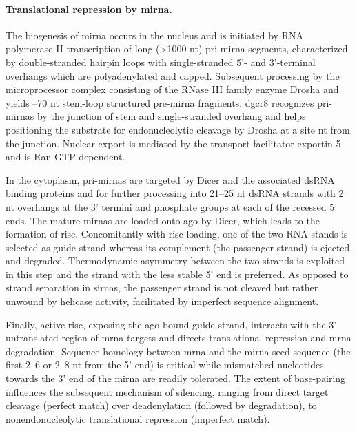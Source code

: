\paragraph{Translational repression by \gls{mirna}.}
The biogenesis of \gls{mirna} occurs in the nucleus and is initiated by RNA polymerase II transcription of long (\textgreater 1000 nt) \gls{pri-mirna} segments, characterized by double-stranded hairpin loops with single-stranded 5'- and 3'-terminal overhangs which are polyadenylated and capped. Subsequent processing by the microprocessor complex consisting of the RNase III family enzyme Drosha and  yields --70 nt stem-loop structured \gls{pre-mirna} fragments. \gls{dgcr8} recognizes \glspl{pri-mirna} by the junction of stem and single-stranded overhang and helps positioning the substrate for endonucleolytic cleavage by Drosha at a site  nt from the junction. Nuclear export is mediated by the transport facilitator exportin-5 and is Ran-GTP dependent.

In the cytoplasm, \glspl{pri-mirna} are targeted by Dicer and the associated dsRNA binding proteins  and  for further processing into 21--25 nt dsRNA strands with 2 nt overhangs at the 3' termini and phosphate groups at each of the recessed 5' ends. The mature \glspl{mirna} are loaded onto \gls{ago} by Dicer, which leads to the formation of \gls{risc}. Concomitantly with \gls{risc}-loading, one of the two RNA stands is selected as guide strand whereas its complement (the passenger strand) is ejected and degraded. Thermodynamic asymmetry between the two strands is exploited in this step and the strand with the less stable 5' end is preferred. As opposed to strand separation in \glspl{sirna}, the passenger strand is not cleaved but rather unwound by helicase activity, facilitated by imperfect sequence alignment.

Finally, active \gls{risc}, exposing the \glsdesc{ago}-bound guide strand, interacts with the 3' untranslated region of \gls{mrna} targets and directs translational repression and \gls{mrna} degradation. Sequence homology between \gls{mrna} and the \gls{mirna} seed sequence (the first 2--6 or 2--8 nt from the 5' end) is critical while mismatched nucleotides towards the 3' end of the \gls{mirna} are readily tolerated. The extent of base-pairing influences the subsequent mechanism of silencing, ranging from direct target cleavage (perfect match) over deadenylation (followed by degradation), to nonendonucleolytic translational repression (imperfect match).

